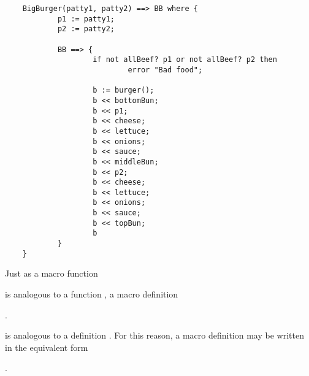 \begin{small}
\begin{verbatim}
    BigBurger(patty1, patty2) ==> BB where {
            p1 := patty1;
            p2 := patty2;

            BB ==> {
                    if not allBeef? p1 or not allBeef? p2 then
                            error "Bad food";

                    b := burger();
                    b << bottomBun;
                    b << p1;
                    b << cheese;
                    b << lettuce;
                    b << onions;
                    b << sauce;
                    b << middleBun;
                    b << p2;
                    b << cheese;
                    b << lettuce;
                    b << onions;
                    b << sauce;
                    b << topBun;
                    b
            }
    }
\end{verbatim}
\end{small}

Just as a macro function


is analogous to a function ,
a macro definition

.

is analogous to a definition .
For this reason, a macro definition may be written
in the equivalent form

.

